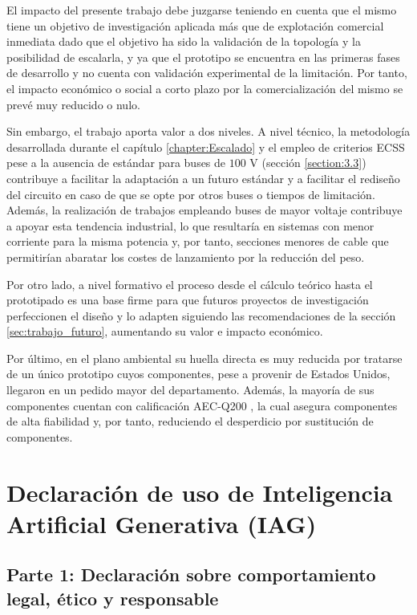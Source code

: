 \documentclass[12pt]{report} %
\begin{document}
El impacto del presente trabajo debe juzgarse teniendo en cuenta que el mismo tiene un objetivo de investigación aplicada más que de explotación comercial inmediata dado que el objetivo ha sido la validación de la topología y la posibilidad de escalarla, y ya que el prototipo se encuentra en las primeras fases de desarrollo y no cuenta con validación experimental de la limitación. Por tanto, el impacto económico o social a corto plazo por la comercialización del mismo se prevé muy reducido o nulo.

Sin embargo, el trabajo aporta valor a dos niveles. A nivel técnico, la metodología desarrollada durante el capítulo \ref{chapter:Escalado} y el empleo de criterios ECSS pese a la ausencia de estándar para buses de $100\text{ V}$ (sección \ref{section:3.3}) contribuye a facilitar la adaptación a un futuro estándar y a facilitar el rediseño del circuito en caso de que se opte por otros buses o tiempos de limitación. Además, la realización de trabajos empleando buses de mayor voltaje contribuye a apoyar esta tendencia industrial, lo que resultaría en sistemas con menor corriente para la misma potencia y, por tanto, secciones menores de cable que permitirían abaratar los costes de lanzamiento por la reducción del peso. 

Por otro lado, a nivel formativo el proceso desde el cálculo teórico hasta el prototipado es una base firme para que futuros proyectos de investigación perfeccionen el diseño y lo adapten siguiendo las recomendaciones de la sección \ref{sec:trabajo_futuro}, aumentando su valor e impacto económico.

Por último, en el plano ambiental su huella directa es muy reducida por tratarse de un único prototipo cuyos componentes, pese a provenir de Estados Unidos, llegaron en un pedido mayor del departamento. Además, la mayoría de sus componentes cuentan con calificación AEC-Q200 \cite{noauthor_what_nodate}, la cual asegura componentes de alta fiabilidad y, por tanto, reduciendo el desperdicio por sustitución de componentes.


\chapter{Declaración de uso de Inteligencia Artificial Generativa (IAG)}

\section*{Parte 1: Declaración sobre comportamiento legal, ético y responsable}
\end{document}
